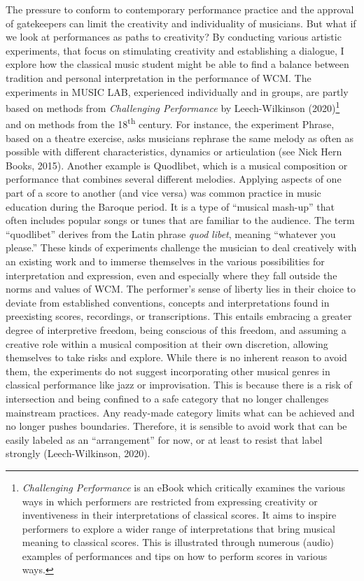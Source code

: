 \documentclass[authordate, empirical, issue]{jote-new-article}
\begin{document}
\noindent The pressure to conform to contemporary performance practice and the approval of gatekeepers can limit the creativity and individuality of musicians. But what if we look at performances as paths to creativity? By conducting various artistic experiments, that focus on stimulating creativity and establishing a dialogue, I explore how the classical music student might be able to find a balance between tradition and personal interpretation in the performance of WCM. The experiments in MUSIC LAB, experienced individually and in groups, are partly based on methods from \emph{Challenging Performance} by Leech-Wilkinson (2020)\footnote{\emph{Challenging Performance} is an eBook which critically examines the various ways in which performers are restricted from expressing creativity or inventiveness in their interpretations of classical scores. It aims to inspire performers to explore a wider range of interpretations that bring musical meaning to classical scores. This is illustrated through numerous (audio) examples of performances and tips on how to perform scores in various ways.} and on methods from the 18\textsuperscript{th} century. For instance, the experiment Phrase, based on a theatre exercise, asks musicians rephrase the same melody as often as possible with different characteristics, dynamics or articulation (see Nick Hern Books, 2015). Another example is Quodlibet, which is a musical composition or performance that combines several different melodies. Applying aspects of one part of a score to another (and vice versa) was common practice in music education during the Baroque period. It is a type of “musical mash-up” that often includes popular songs or tunes that are familiar to the audience. The term “quodlibet” derives from the Latin phrase \emph{quod}\emph{ }\emph{libet}, meaning “whatever you please.” These kinds of experiments challenge the musician to deal creatively with an existing work and to immerse themselves in the various possibilities for interpretation and expression, even and especially where they fall outside the norms and values of WCM. The performer's sense of liberty lies in their choice to deviate from established conventions, concepts and interpretations found in preexisting scores, recordings, or transcriptions. This entails embracing a greater degree of interpretive freedom, being conscious of this freedom, and assuming a creative role within a musical composition at their own discretion, allowing themselves to take risks and explore. While there is no inherent reason to avoid them, the experiments do not suggest incorporating other musical genres in classical performance like jazz or improvisation. This is because there is a risk of intersection and being confined to a safe category that no longer challenges mainstream practices. Any ready-made category limits what can be achieved and no longer pushes boundaries. Therefore, it is sensible to avoid work that can be easily labeled as an “arrangement” for now, or at least to resist that label strongly (Leech-Wilkinson, 2020).
\end{document}
